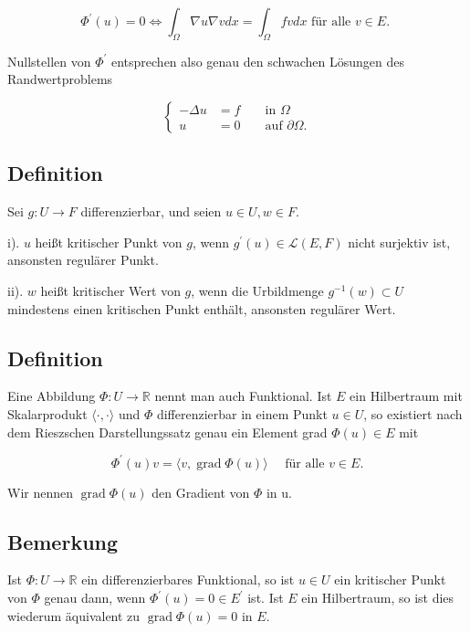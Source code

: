 \documentclass[10pt, letterpaper]{article}
\begin{document}
$$
\Phi^{\prime}(u)=0 \Longleftrightarrow \int_{\Omega} \nabla u \nabla v d x=\int_{\Omega} f v d x \text { für alle } v \in E \text {. }
$$

Nullstellen von $\Phi^{\prime}$ entsprechen also genau den schwachen Lösungen des Randwertproblems

$$
\left\{\begin{aligned}
-\Delta u & =f & & \text { in } \Omega \\
u & =0 & & \text { auf } \partial \Omega .
\end{aligned}\right.
$$

\subsection*{Definition}

Sei $g: U \rightarrow F$ differenzierbar, und seien $u \in U, w \in F$.

i). $u$ heißt kritischer Punkt von $g$, wenn $g^{\prime}(u) \in \mathcal{L}(E, F)$ nicht surjektiv ist, ansonsten regulärer Punkt.

ii). $w$ heißt kritischer Wert von $g$, wenn die Urbildmenge $g^{-1}(w) \subset U$ mindestens einen kritischen Punkt enthält, ansonsten regulärer Wert.

\subsection*{Definition}

Eine Abbildung $\Phi: U \rightarrow \mathbb{R}$ nennt man auch Funktional. Ist $E$ ein Hilbertraum mit Skalarprodukt $\langle\cdot, \cdot\rangle$ und $\Phi$ differenzierbar in einem Punkt $u \in U$, so existiert nach dem Rieszschen Darstellungssatz genau ein Element grad $\Phi(u) \in E$ mit

$$
\Phi^{\prime}(u) v=\langle v, \operatorname{grad} \Phi(u)\rangle \quad \text { für alle } v \in E .
$$

Wir nennen $\operatorname{grad} \Phi(u)$ den Gradient von $\Phi$ in u.

\subsection*{Bemerkung}

Ist $\Phi: U \rightarrow \mathbb{R}$ ein differenzierbares Funktional, so ist $u \in U$ ein kritischer Punkt von $\Phi$ genau dann, wenn $\Phi^{\prime}(u)=0 \in E^{\prime}$ ist. Ist $E$ ein Hilbertraum, so ist dies wiederum äquivalent zu $\operatorname{grad} \Phi(u)=0$ in $E$.
\end{document}
